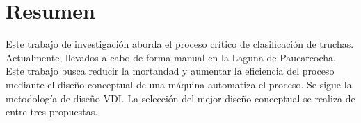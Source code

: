 
\newpage
\clearpage{\pagestyle{empty}\cleardoublepage}
\newpage

\pagestyle{empty}
\newpage
\chapter*{\centering \large Resumen} 

Este trabajo de investigación aborda el proceso crítico de clasificación de truchas. Actualmente, llevados a cabo de forma manual en la Laguna de Paucarcocha. Este trabajo busca reducir la mortandad y aumentar la eficiencia del proceso mediante el diseño conceptual de una máquina automatiza el proceso. Se sigue la metodología de diseño VDI. La selección del mejor diseño conceptual se realiza de entre tres propuestas.

